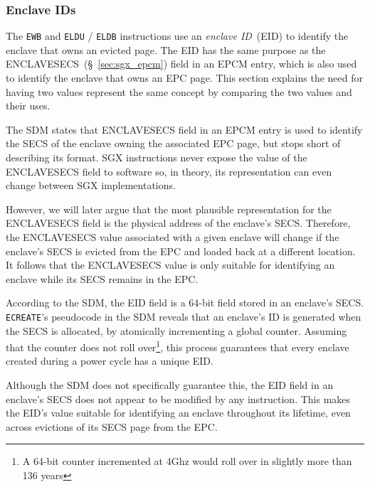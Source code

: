 \subsubsection{Enclave IDs}
\label{sec:sgx_eid}

The \texttt{EWB} and \texttt{ELDU} / \texttt{ELDB} instructions use an
\textit{enclave ID}~(EID) to identify the enclave that owns an evicted page.
The EID has the same purpose as the ENCLAVESECS~(\S~\ref{sec:sgx_epcm}) field
in an EPCM entry, which is also used to identify the enclave that owns an EPC
page. This section explains the need for having two values represent the same
concept by comparing the two values and their uses.


The SDM states that ENCLAVESECS field in an EPCM entry is used to identify the
SECS of the enclave owning the associated EPC page, but stops short of
describing its format. SGX instructions never expose the value of the
ENCLAVESECS field to software so, in theory, its representation can even change
between SGX implementations.


However, we will later argue that the most plausible representation for the
ENCLAVESECS field is the physical address of the enclave's SECS. Therefore, the
ENCLAVESECS value associated with a given enclave will change if the enclave's
SECS is evicted from the EPC and loaded back at a different location. It
follows that the ENCLAVESECS value is only suitable for identifying an enclave
while its SECS remains in the EPC.


According to the SDM, the EID field is a 64-bit field stored in an enclave's
SECS. \texttt{ECREATE}'s pseudocode in the SDM reveals that an enclave's ID is
generated when the SECS is allocated, by atomically incrementing a global
counter. Assuming that the counter does not roll over\footnote{A 64-bit counter
incremented at 4Ghz would roll over in slightly more than 136 years}, this
process guarantees that every enclave created during a power cycle has a unique
EID.

Although the SDM does not specifically guarantee this, the EID field in an
enclave's SECS does not appear to be modified by any instruction. This makes
the EID's value suitable for identifying an enclave throughout its lifetime,
even across evictions of its SECS page from the EPC.


